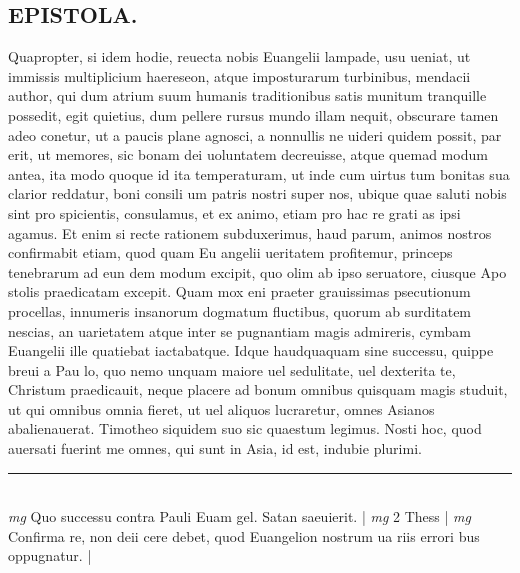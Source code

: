 \documentclass{article}
\begin{document}
\begin{pages}
\section*{EPISTOLA. }\pstart Quapropter, si idem hodie, reuecta nobis Euangelii lampade, usu ueniat, ut immissis multiplicium haereseon, atque imposturarum turbinibus, mendacii author, qui dum atrium suum humanis traditionibus satis munitum tranquille possedit, egit quietius, dum pellere rursus mundo illam nequit, obscurare tamen adeo conetur, ut a paucis plane agnosci, a nonnullis ne uideri quidem possit, par erit, ut memores, sic bonam dei uoluntatem decreuisse, atque quemad modum antea, ita modo quoque id ita temperaturam, ut inde cum uirtus tum bonitas sua clarior reddatur, boni consili um patris nostri super nos, ubique quae saluti nobis sint pro spicientis, consulamus, et ex animo, etiam pro hac re grati as ipsi agamus. Et enim si recte rationem subduxerimus, haud parum, animos nostros confirmabit etiam, quod quam Eu angelii ueritatem profitemur, princeps tenebrarum ad eun dem modum excipit, quo olim ab ipso seruatore, ciusque Apo stolis praedicatam excepit.  \pend\pstart Quam mox eni praeter grauissimas psecutionum procellas, innumeris insanorum dogmatum fluctibus, quorum ab surditatem nescias, an uarietatem atque inter se pugnantiam magis admireris, cymbam Euangelii ille quatiebat iactabatque. Idque haudquaquam sine successu, quippe breui a Pau lo, quo nemo unquam maiore uel sedulitate, uel dexterita te, Christum praedicauit, neque placere ad bonum omnibus quisquam magis studuit, ut qui omnibus   omnia fieret, ut uel aliquos lucraretur, omnes Asianos abalienauerat. Timotheo siquidem suo sic quaestum legimus. Nosti hoc, quod auersati fuerint me omnes, qui sunt in Asia, id est, indubie plurimi.   \pend
\vspace{0.5cm}\noindent
\vspace{0.2cm}\rule{1cm}{0.2pt}\\ 
\hspace{0.2cm}\textit{mg}
\footnotesize Quo successu contra Pauli Euam gel. Satan saeuierit.  
\normalsize| 
\hspace{0.2cm}\textit{mg}
\footnotesize 2 Thess 
\normalsize| 
\hspace{0.2cm}\textit{mg}
\footnotesize Confirma re, non deii cere debet, quod Euangelion nostrum ua riis errori bus oppugnatur. 
\normalsize| 

\end{pages}
\end{document}
